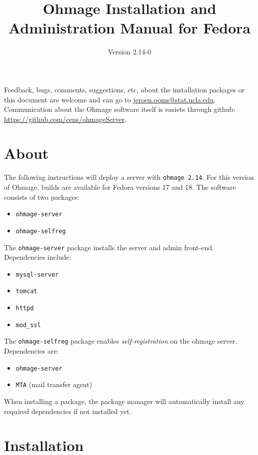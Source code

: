 \documentclass{scrartcl}
\title{Ohmage Installation and Administration Manual for Fedora}
\subtitle{Version 2.14-0}
\begin{document}
\maketitle

\noindent Feedback, bugs, comments, suggestions, etc, about the installation
packages or this document are welcome and can go to \href{mailto:jeroen.ooms@stat.ucla.edu}{jeroen.ooms@stat.ucla.edu}.
Communication about the Ohmage software itself is easiets through github:
\href{https://github.com/cens/ohmageServer}{https://github.com/cens/ohmageServer}.

\section*{About}

\noindent The following instructions will deploy a server with \texttt{ohmage
2.14}. For this version of Ohmage, builds are available for Fedora versions 17 and 18.
The software consists of two packages:

\begin{itemize}
  \item \texttt{ohmage-server}
  \item \texttt{ohmage-selfreg} 
\end{itemize}

\noindent The \texttt{ohmage-server} package installs the server and
admin front-end. Dependencies include:

\begin{itemize}
  \item \texttt{mysql-server}
  \item \texttt{tomcat}
  \item \texttt{httpd}
  \item \texttt{mod\_ssl}
\end{itemize}

\noindent The \texttt{ohmage-selfreg} package enables \emph{self-registration}
on the ohmage server. Dependencies are:

\begin{itemize}
  \item \texttt{ohmage-server}
  \item \texttt{MTA} (mail transfer agent)
\end{itemize}

\noindent When installing a package, the package manager will automatically
install any required dependencies if not installed yet.


\section{Installation}
\end{document}
